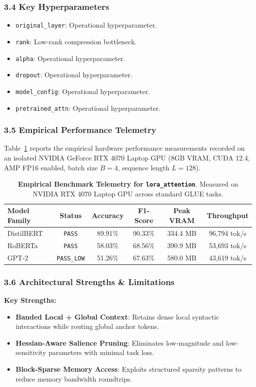 \subsubsection*{3.4 Key Hyperparameters}
\begin{itemize}
    \item \texttt{original\_layer}: Operational hyperparameter.
    \item \texttt{rank}: Low-rank compression bottleneck.
    \item \texttt{alpha}: Operational hyperparameter.
    \item \texttt{dropout}: Operational hyperparameter.
    \item \texttt{model\_config}: Operational hyperparameter.
    \item \texttt{pretrained\_attn}: Operational hyperparameter.
\end{itemize}

\subsubsection*{3.5 Empirical Performance Telemetry}
Table~\ref{tab:telemetry_lora_attention} reports the empirical hardware performance measurements recorded on an isolated NVIDIA GeForce RTX 4070 Laptop GPU (8GB VRAM, CUDA 12.4, AMP FP16 enabled, batch size $B=4$, sequence length $L=128$).

\begin{table}[h]
\centering
\small
\caption{\textbf{Empirical Benchmark Telemetry for \texttt{lora\_attention}}. Measured on NVIDIA RTX 4070 Laptop GPU across standard GLUE tasks.}
\label{tab:telemetry_lora_attention}
\begin{tabular*}{\columnwidth}{@{\extracolsep{\fill}}lccccc}
\toprule
\textbf{Model Family} & \textbf{Status} & \textbf{Accuracy} & \textbf{F1-Score} & \textbf{Peak VRAM} & \textbf{Throughput} \\
\midrule
DistilBERT & \texttt{PASS} & 89.91\% & 90.33\% & 334.4 MB & 96,794 tok/s \\
RoBERTa & \texttt{PASS} & 58.03\% & 68.56\% & 390.9 MB & 53,693 tok/s \\
GPT-2 & \texttt{PASS\_LOW} & 51.26\% & 67.63\% & 580.0 MB & 43,619 tok/s \\
\bottomrule
\end{tabular*}
\end{table}

\subsubsection*{3.6 Architectural Strengths \& Limitations}
\textbf{Key Strengths:}
\begin{itemize}
    \item \textbf{Banded Local + Global Context}: Retains dense local syntactic interactions while routing global anchor tokens.
    \item \textbf{Hessian-Aware Salience Pruning}: Eliminates low-magnitude and low-sensitivity parameters with minimal task loss.
    \item \textbf{Block-Sparse Memory Access}: Exploits structured sparsity patterns to reduce memory bandwidth roundtrips.
\end{itemize}

